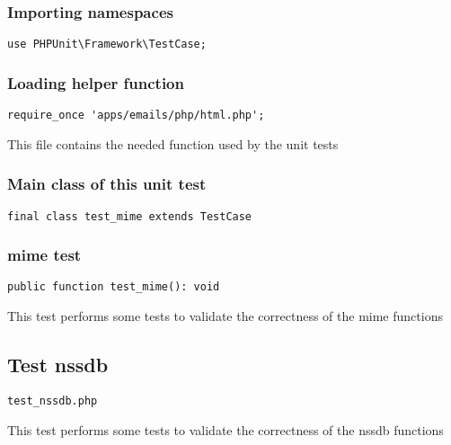 \documentclass[a4paper]{article}
\begin{document}
\hypertarget{toc268}{}
\subsubsection{Importing namespaces}

\begin{lstlisting}
use PHPUnit\Framework\TestCase;
\end{lstlisting}

\hypertarget{toc269}{}
\subsubsection{Loading helper function}

\begin{lstlisting}
require_once 'apps/emails/php/html.php';
\end{lstlisting}

This file contains the needed function used by the unit tests

\hypertarget{toc270}{}
\subsubsection{Main class of this unit test}

\begin{lstlisting}
final class test_mime extends TestCase
\end{lstlisting}

\hypertarget{toc271}{}
\subsubsection{mime test}

\begin{lstlisting}
public function test_mime(): void
\end{lstlisting}

This test performs some tests to validate the correctness
of the mime functions

\hypertarget{toc272}{}
\subsection{Test nssdb}

\begin{lstlisting}
test_nssdb.php
\end{lstlisting}

This test performs some tests to validate the correctness
of the nssdb functions

\hypertarget{toc273}{}
\end{document}
